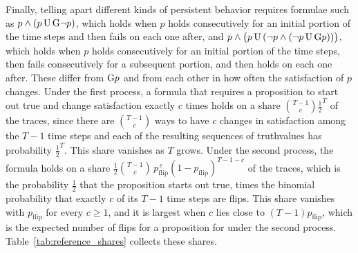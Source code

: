 \documentclass[titlepage,a4paper,11pt]{report}
\begin{document}
    Finally, telling apart different kinds of persistent behavior requires formulae such as $p\land(p\,\text{U}\,\text{G}\neg p)$, which holds when $p$ holds consecutively for an initial portion of the time steps and then fails on each one after, and $p\land\bigl(p\,\text{U}\,(\neg p\land(\neg p\,\text{U}\,\text{G} p))\bigr)$, which holds when $p$ holds consecutively for an initial portion of the time steps, then fails consecutively for a subsequent portion, and then holds on each one after. These differ from $\text{G} p$ and from each other in how often the satisfaction of $p$ changes. Under the first process, a formula that requires a proposition to start out true and change satisfaction exactly $c$ times holds on a share $\binom{T-1}{c}\frac12^{T}$ of the traces, since there are $\binom{T-1}{c}$ ways to have $c$ changes in satisfaction among the $T-1$ time steps and each of the resulting sequences of truthvalues has probability $\frac12^{T}$. This share vanishes as $T$ grows. Under the second process, the formula holds on a share $\frac12\binom{T-1}{c}\,p_{\text{flip}}^{\,c}(1-p_{\text{flip}})^{T-1-c}$ of the traces, which is the probability $\frac12$ that the proposition starts out true, times the binomial probability that exactly $c$ of its $T-1$ time steps are flips. This share vanishes with $p_{\text{flip}}$ for every $c\ge1$, and it is largest when $c$ lies close to $(T-1)p_{\text{flip}}$, which is the expected number of flips for a proposition for under the second process. Table~\ref{tab:reference_shares} collects these shares.
 
\end{document}
